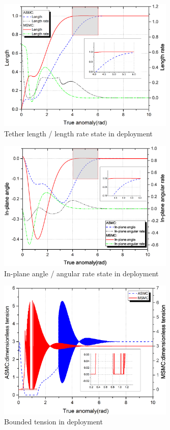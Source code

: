 \documentclass[3p]{elsarticle}
\theoremstyle{plain}
\begin{document}
\begin{figure}
\centering
\includegraphics[width=0.75\textwidth]{deployment_length_and_rate.eps}
\caption{Tether length / length rate state in deployment}
\label{fig:length}
\end{figure}
\begin{figure}
\centering
\includegraphics[width=0.75\textwidth]{deployment_angle_and_rate.eps}
\caption{In-plane angle / angular rate state in deployment}
\label{fig:theta}
\end{figure}
\begin{figure}
\centering
\includegraphics[width=0.75\textwidth]{deployment_tension.eps}
\caption{Bounded tension in deployment}
\label{fig:tension}
\end{figure}
\end{document}
